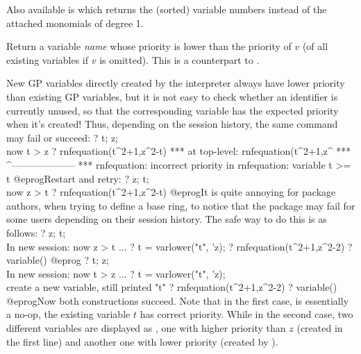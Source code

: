Also available is  which returns
the (sorted) variable numbers instead of the attached monomials of degree 1.

\label{se:varlower}
Return a variable \emph{name} whose priority is lower
than the priority of $v$ (of all existing variables if $v$ is omitted).
This is a counterpart to .

New GP variables directly created by the interpreter always
have lower priority than existing GP variables, but it is not easy
to check whether an identifier is currently unused, so that the
corresponding variable has the expected priority when it's created!
Thus, depending on the session history, the same command may fail or succeed:
\bprog
? t; z;  \\ now t > z
? rnfequation(t^2+1,z^2-t)
 ***   at top-level: rnfequation(t^2+1,z^
 ***                 ^--------------------
 *** rnfequation: incorrect priority in rnfequation: variable t >= t
@eprog\noindent Restart and retry:
\bprog
? z; t;  \\ now z > t
? rnfequation(t^2+1,z^2-t)
@eprog\noindent It is quite annoying for package authors, when trying to
define a base ring, to notice that the package may fail for some users
depending on their session history. The safe way to do this is as follows:
\bprog
? z; t;  \\ In new session: now z > t
...
? t = varlower("t", 'z);
? rnfequation(t^2+1,z^2-2)
? variable()
@eprog
\bprog
? t; z;  \\ In new session: now t > z
...
? t = varlower("t", 'z); \\ create a new variable, still printed "t"
? rnfequation(t^2+1,z^2-2)
? variable()
@eprog\noindent Now both constructions succeed. Note that in the
first case,  is essentially a no-op, the existing variable $t$
has correct priority. While in the second case, two different variables are
displayed as , one with higher priority than $z$ (created in the first
 line) and another one with lower priority (created by ).

